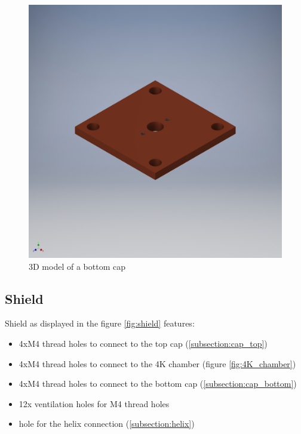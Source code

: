 \begin{figure}[h]
	\centering
	\includegraphics[width=\textwidth]{images/cap_bottom}
	\caption{3D model of a bottom cap}
	\label{fig:cap_bottom}
\end{figure}

\clearpage
\subsection{Shield}
\label{subsection:shield}
Shield as displayed in the figure \ref{fig:shield} features:
\begin{itemize}
	\item 4xM4 thread holes to connect to the top cap (\ref{subsection:cap_top})
	\item 4xM4 thread holes to connect to the 4K chamber (figure \ref{fig:4K_chamber})
	\item 4xM4 thread holes to connect to the bottom cap (\ref{subsection:cap_bottom})
	\item 12x ventilation holes for M4 thread holes
	\item hole for the helix connection (\ref{subsection:helix})
\end{itemize}

